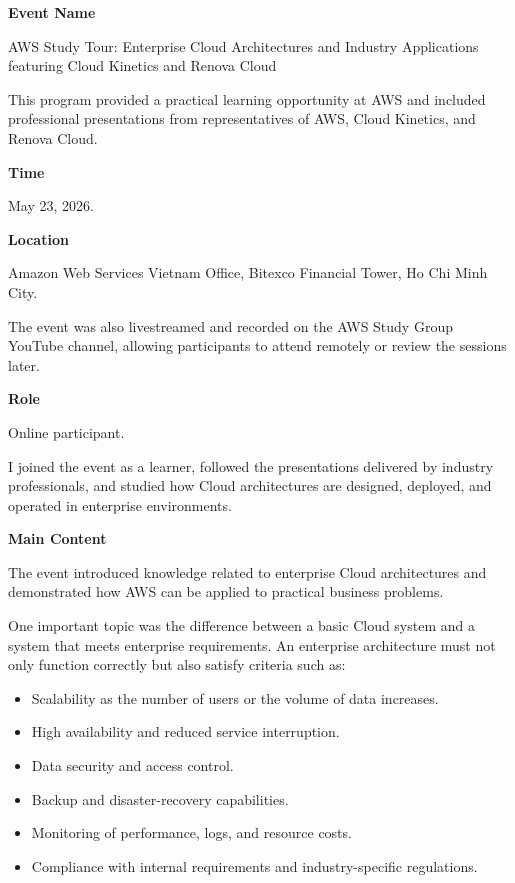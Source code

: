 \vspace{0.5em}\noindent\textbf{Event Name}\par

AWS Study Tour: Enterprise Cloud Architectures and Industry Applications
featuring Cloud Kinetics and Renova Cloud

This program provided a practical learning opportunity at AWS and
included professional presentations from representatives of AWS, Cloud
Kinetics, and Renova Cloud.

\vspace{0.5em}\noindent\textbf{Time}\par

May 23, 2026.

\vspace{0.5em}\noindent\textbf{Location}\par

Amazon Web Services Vietnam Office, Bitexco Financial Tower, Ho Chi Minh
City.

The event was also livestreamed and recorded on the AWS Study Group
YouTube channel, allowing participants to attend remotely or review the
sessions later.

\vspace{0.5em}\noindent\textbf{Role}\par

Online participant.

I joined the event as a learner, followed the presentations delivered by
industry professionals, and studied how Cloud architectures are
designed, deployed, and operated in enterprise environments.

\vspace{0.5em}\noindent\textbf{Main Content}\par

The event introduced knowledge related to enterprise Cloud architectures
and demonstrated how AWS can be applied to practical business problems.

One important topic was the difference between a basic Cloud system and
a system that meets enterprise requirements. An enterprise architecture
must not only function correctly but also satisfy criteria such as:

\begin{itemize}
\tightlist
\item
  Scalability as the number of users or the volume of data increases.
\item
  High availability and reduced service interruption.
\item
  Data security and access control.
\item
  Backup and disaster-recovery capabilities.
\item
  Monitoring of performance, logs, and resource costs.
\item
  Compliance with internal requirements and industry-specific
  regulations.
\end{itemize}

